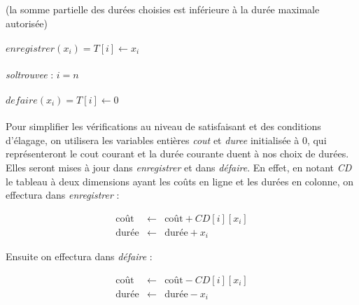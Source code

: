 \documentclass[a4paper, titlepage]{article}
\begin{document}
	(la somme partielle des durées choisies est inférieure à la durée maximale autorisée)

	\paragraph{}\noindent
	$enregistrer(x_{i}) = T[i] \leftarrow x_{i}$

	\paragraph{}\noindent
	\emph{soltrouvee} : $i = n$

	\paragraph{}\noindent
	$defaire(x_{i}) = T[i] \leftarrow 0$

	\paragraph{}
	Pour simplifier les vérifications au niveau de satisfaisant et des conditions d'élagage, on utilisera les variables entières \emph{cout} et \emph{duree} initialisée à 0,
	qui représenteront le cout courant et la durée courante duent à nos choix de durées.
	Elles seront mises à jour dans \emph{enregistrer} et dans \emph{défaire}.
	En effet, en notant \emph{CD} le tableau à deux dimensions ayant les coûts en ligne et les durées en colonne, on effectura dans \emph{enregistrer} :

		\begin{eqnarray*}
			\mbox{coût}  & \leftarrow & \mbox{coût} + CD[i][x_{i}] \\
			\mbox{durée} & \leftarrow & \mbox{durée} + x_{i}
		\end{eqnarray*}

	Ensuite on effectura dans \emph{défaire} :

		\begin{eqnarray*}
			\mbox{coût}  & \leftarrow & \mbox{coût} - CD[i][x_{i}] \\
			\mbox{durée} & \leftarrow & \mbox{durée} - x_{i}
		\end{eqnarray*}
\end{document}
